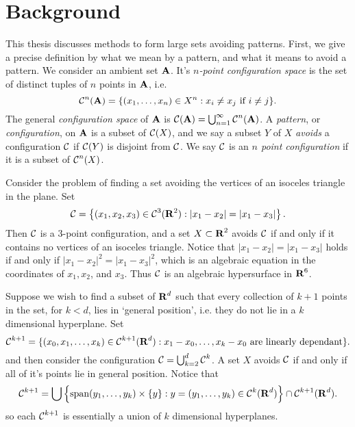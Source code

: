 
\chapter{Background}
\label{ch:Background}

This thesis discusses methods to form large sets avoiding patterns. First, we give a precise definition by what we mean by a pattern, and what it means to avoid a pattern. We consider an ambient set $\operatorname{\mathbf{A}}$. It's {\it $n$-point configuration space} is the set of distinct tuples of $n$ points in $\operatorname{\mathbf{A}}$, i.e.
%
\[ \operatorname{\mathcal{C}}^n(\operatorname{\mathbf{A}}) = \{ (x_1, \dots, x_n) \in X^n: x_i \neq x_j\ \text{if $i \neq j$} \}. \]
%
The general {\it configuration space} of $\operatorname{\mathbf{A}}$ is $\operatorname{\mathcal{C}}(\operatorname{\mathbf{A}}) = \bigcup_{n = 1}^\infty \operatorname{\mathcal{C}}^n(\operatorname{\mathbf{A}})$. A {\it pattern}, or {\it configuration}, on $\operatorname{\mathbf{A}}$ is a subset of $\operatorname{\mathcal{C}}(X)$, and we say a subset $Y$ of $X$ {\it avoids} a configuration $\operatorname{\mathcal{C}}$ if $\operatorname{\mathcal{C}}(Y)$ is disjoint from $\operatorname{\mathcal{C}}$. We say $\operatorname{\mathcal{C}}$ is an {\it $n$ point configuration} if it is a subset of $\operatorname{\mathcal{C}}^n(X)$.

\begin{example}
	Consider the problem of finding a set avoiding the vertices of an isoceles triangle in the plane. Set
	\[ \operatorname{\mathcal{C}} = \left\{ (x_1, x_2, x_3) \in \operatorname{\mathcal{C}}^3(\operatorname{\mathbf{R}}^2) : |x_1-x_2| = |x_1-x_3| \right\}. \]
	Then $\operatorname{\mathcal{C}}$ is a 3-point configuration, and a set $X \subset \operatorname{\mathbf{R}}^2$ avoids $\operatorname{\mathcal{C}}$ if and only if it contains no vertices of an isoceles triangle. Notice that $|x_1 - x_2| = |x_1 - x_3|$ holds if and only if $|x_1 - x_2|^2 = |x_1 - x_3|^2$, which is an algebraic equation in the coordinates of $x_1,x_2$, and $x_3$. Thus $\operatorname{\mathcal{C}}$ is an algebraic hypersurface in $\operatorname{\mathbf{R}}^6$.
\end{example}

\begin{example}
	Suppose we wish to find a subset of $\operatorname{\mathbf{R}}^d$ such that every collection of $k+1$ points in the set, for $k < d$, lies in `general position', i.e. they do not lie in a $k$ dimensional hyperplane. Set
	\[ \operatorname{\mathcal{C}}^{k+1} = \{ (x_0, x_1, \dots, x_k) \in \operatorname{\mathcal{C}}^{k+1}(\operatorname{\mathbf{R}}^d): x_1-x_0, \dots, x_k - x_0\ \text{are linearly dependant} \}. \]
	and then consider the configuration $\operatorname{\mathcal{C}} = \bigcup_{k = 2}^d \operatorname{\mathcal{C}}^k$. A set $X$ avoids $\operatorname{\mathcal{C}}$ if and only if all of it's points lie in general position. Notice that
	\[ \operatorname{\mathcal{C}}^{k+1} = \bigcup \left\{ \text{span}(y_1, \dots, y_k) \times \{ y \} : y = (y_1, \dots, y_k) \in \operatorname{\mathcal{C}}^k(\operatorname{\mathbf{R}}^d) \right\} \cap \operatorname{\mathcal{C}}^{k+1}(\operatorname{\mathbf{R}}^d). \]
	so each $\operatorname{\mathcal{C}}^{k+1}$ is essentially a union of $k$ dimensional hyperplanes.
\end{example}

